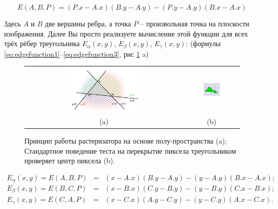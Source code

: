 \documentclass[12pt,subf,href,colorlinks=true]{article}
\begin{document}
\begin{equation}\label{eq:edgefunction}
	E(A,B,P) = (P.x - A.x) (B.y - A.y) - (P.y - A.y)(B.x - A.x)
\end{equation}

Здесь $A$ и $B$ две вершины ребра, а точка $P$ -- произвольная точка на плоскости изображения. Далее Вы просто реализуете вычисление этой функции для всех трёх рёбер треугольника $E_{\alpha}(x,y)$, $E_{\beta}(x,y)$, $E_{\gamma}(x,y)$: (формулы \ref{eq:edgefunction1}--\ref{eq:edgefunction3}, рис \ref{fig:halfspace_and_coverage} a)

\begin{figure}
	\begin{center}
		\begin{tabular}{c c}
			\includegraphics[width=0.5\textwidth]{img/barycentric} & 
			\includegraphics[width=0.325\textwidth]{img/coveragetest} \\
			 (a) & (b)
		\end{tabular}
		\caption{Принцип работы растеризатора на основе полу-пространства (a); Стандартное поведение теста на перекрытие пиксела треугольником проверяет центр пиксела (b).}
		\label{fig:halfspace_and_coverage}
	\end{center}
\end{figure}


\begin{eqnarray}\label{eq:edgefunction1} 
	E_{\alpha}(x,y) = E(A,B,P) &=& (x - A.x)(B.y - A.y) - (y - A.y)(B.x - A.x); \\  \label{eq:edgefunction2}
	E_{\beta} (x,y) = E(B,C,P) &=& (x - B.x)(C.y - B.y) - (y - B.y)(C.x - B.x); \\ \label{eq:edgefunction3}
	E_{\gamma}(x,y) = E(C,A,P) &=& (x - C.x)(A.y - C.y) - (y - C.y)(A.x - C.x).    \label{eq:edgefunction4}
\end{eqnarray}
\end{document}
